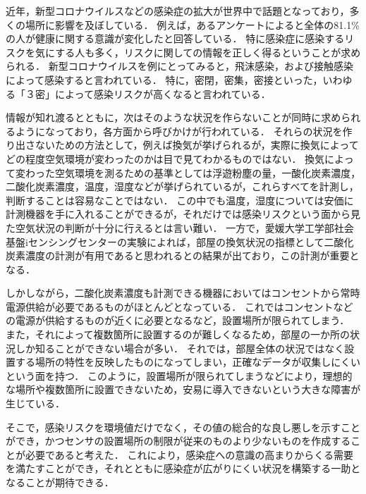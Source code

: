 



近年，新型コロナウイルスなどの感染症の拡大が世界中で話題となっており，多くの場所に影響を及ぼしている．
例えば，あるアンケートによると全体の81.1\%の人が健康に関する意識が変化したと回答している\cite{ishiki}．
特に感染症に感染するリスクを気にする人も多く，リスクに関しての情報を正しく得るということが求められる．
新型コロナウイルスを例にとってみると，飛沫感染，および接触感染によって感染すると言われている．
特に，密閉，密集，密接といった，いわゆる「３密」によって感染リスクが高くなると言われている\cite{koronaQA}．

情報が知れ渡るとともに，次はそのような状況を作らないことが同時に求められるようになっており，各方面から呼びかけが行われている．
それらの状況を作り出さないための方法として，例えば換気が挙げられるが，実際に換気によってどの程度空気環境が変わったのかは目で見てわかるものではない．
換気によって変わった空気環境を測るための基準としては浮遊粉塵の量，一酸化炭素濃度，二酸化炭素濃度，温度，湿度などが挙げられている\cite{kanki}が，これらすべてを計測し，判断することは容易なことではない．
この中でも温度，湿度については安価に計測機器を手に入れることができるが，それだけでは感染リスクという面から見た空気状況の判断が十分に行えるとは言い難い．
一方で，愛媛大学工学部社会基盤iセンシングセンターの実験によれば，部屋の換気状況の指標として二酸化炭素濃度の計測が有用であると思われるとの結果が出ており，この計測が重要となる．

しかしながら，二酸化炭素濃度も計測できる機器においてはコンセントから常時電源供給が必要であるものがほとんどとなっている．
これではコンセントなどの電源が供給するものが近くに必要となるなど，設置場所が限られてしまう．
また，それによって複数箇所に設置するのが難しくなるため，部屋の一か所の状況しか知ることができない場合が多い．
それでは，部屋全体の状況ではなく設置する場所の特性を反映したものになってしまい，正確なデータが収集しにくいという面を持つ．
このように，設置場所が限られてしまうなどにより，理想的な場所や複数箇所に設置できないため，安易に導入できないという大きな障害が生じている．

そこで，感染リスクを環境値だけでなく，その値の総合的な良し悪しを示すことができ，かつセンサの設置場所の制限が従来のものより少ないものを作成することが必要であると考えた．
これにより，感染症への意識の高まりからくる需要を満たすことができ，それとともに感染症が広がりにくい状況を構築する一助となることが期待できる．

